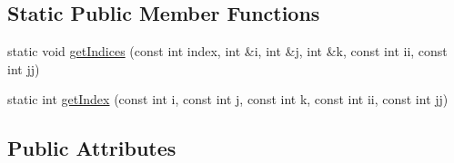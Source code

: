 \subsection*{Static Public Member Functions}
\begin{DoxyCompactItemize}
\item 
static void \hyperlink{classccmc_1_1_l_f_m_interpolator_aebe68b339853a7036313e7f83ce5cc0b}{get\-Indices} (const int index, int \&i, int \&j, int \&k, const int ii, const int jj)
\item 
static int \hyperlink{classccmc_1_1_l_f_m_interpolator_a98168d119f050e925ad98a4cbec2c360}{get\-Index} (const int i, const int j, const int k, const int ii, const int jj)
\end{DoxyCompactItemize}
\subsection*{Public Attributes}
